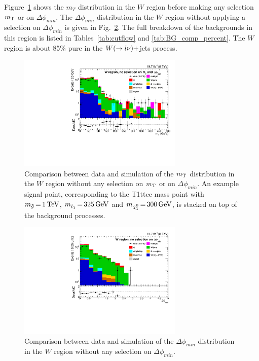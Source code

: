 Figure~\ref{fig:boost_W_region_mT} shows the $m_T$ distribution in the $W$ region before making any
selection $m_{\mathrm{T}}$ or on $\Delta\phi_{min}$. The $\Delta\phi_{min}$ distribution in the $W$ region
without applying a selection on $\Delta\phi_{min}$ is given in
Fig.~\ref{fig:boost_W_region_mindeltaphi}. The full breakdown of the backgrounds in this region is
listed in Tables~\ref{tab:cutflow} and \ref{tab:BG_comp_percent}. The $W$ region is about 85\% pure
in the $W(\rightarrow l\nu)+$jets process. 

\begin{figure}[htbp]
\centering
\includegraphics[width=0.7\textwidth]{figures/razor_selection/plots/DataMC_mT_0Lbg1Y1Ll_rebin}
\caption{Comparison between data and simulation of the $m_{\mathrm{T}}$ distribution in the $W$ region without
any selection on $m_{\mathrm{T}}$ or on $\Delta\phi_{min}$. An example signal
point, corresponding to the T1ttcc mass point with $m_{\tilde{g}} \,{=}\, 1\,\text{Te\hspace{-.08em}V}$,
$m_{\tilde{t}_1} \,{=}\, 325\,\text{Ge\hspace{-.08em}V}$ and $m_{\tilde{\chi}_1^0} \,{=}\, 300\,\text{Ge\hspace{-.08em}V}$, is stacked on top of
the background processes.
\label{fig:boost_W_region_mT}}
\end{figure}

\begin{figure}[htbp]
\centering
\includegraphics[width=0.7\textwidth]
{figures/razor_selection/plots/DataMC_minDeltaPhi_0Lbg1Y1LlmT_rebin}
\caption{Comparison between data and simulation of the $\Delta\phi_{min}$ distribution in the $W$
region without any selection on $\Delta\phi_{min}$. 
\label{fig:boost_W_region_mindeltaphi}}
\end{figure}

